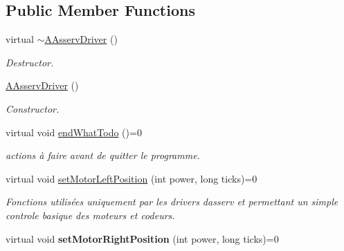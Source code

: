\subsection*{Public Member Functions}
\begin{DoxyCompactItemize}
\item 
\mbox{\label{classAAsservDriver_a624c97511d788f1df927625a1d0eb54c}} 
virtual \hyperlink{classAAsservDriver_a624c97511d788f1df927625a1d0eb54c}{$\sim$\+A\+Asserv\+Driver} ()
\begin{DoxyCompactList}\small\item\em Destructor. \end{DoxyCompactList}\item 
\mbox{\label{classAAsservDriver_af6a0b1c219c8a25d589667f05da7f64d}} 
\hyperlink{classAAsservDriver_af6a0b1c219c8a25d589667f05da7f64d}{A\+Asserv\+Driver} ()
\begin{DoxyCompactList}\small\item\em Constructor. \end{DoxyCompactList}\item 
\mbox{\label{classAAsservDriver_a54ee068cec3c9f9f98b9e6b3d8c10f6e}} 
virtual void \hyperlink{classAAsservDriver_a54ee068cec3c9f9f98b9e6b3d8c10f6e}{end\+What\+Todo} ()=0
\begin{DoxyCompactList}\small\item\em actions à faire avant de quitter le programme. \end{DoxyCompactList}\item 
\mbox{\label{classAAsservDriver_a77a5c938390e25a3231fe8b735ff3237}} 
virtual void \hyperlink{classAAsservDriver_a77a5c938390e25a3231fe8b735ff3237}{set\+Motor\+Left\+Position} (int power, long ticks)=0
\begin{DoxyCompactList}\small\item\em Fonctions utilisées uniquement par les drivers d\textquotesingle{}asserv et permettant un simple controle basique des moteurs et codeurs. \end{DoxyCompactList}\item 
\mbox{\label{classAAsservDriver_a68eacbe79f71032a0dab1109948ea5f8}} 
virtual void {\bfseries set\+Motor\+Right\+Position} (int power, long ticks)=0

\end{DoxyCompactItemize}
